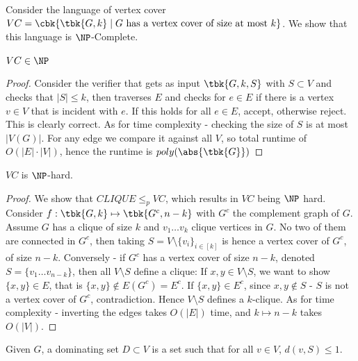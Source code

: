 \begin{example}
	Consider the language of vertex cover $VC = \cbk{\tbk{G,k}\mid G\text{ has a vertex cover of size at most }k}$. We show that this language is $\NP$-Complete.
	\begin{prop}
		$VC\in \NP$
	\end{prop}
\begin{proof}
	Consider the verifier that gets as input $\tbk{G,k,S}$ with $S\subset V$ and checks that $|S| \leq k$, then traverses $E$ and checks for $e\in E$ if there is a vertex $v\in V$ that is incident with $e$. If this holds for all $e\in E$, accept, otherwise reject. This is clearly correct. As for time complexity - checking the size of $S$ is at most $|V(G)|$. For any edge we compare it against all $V$, so total runtime of $O(|E|\cdot |V|)$, hence the runtime is $poly(\abs{\tbk{G}})$
\end{proof}
\begin{prop}
	$VC$ is $\NP$-hard.
\end{prop}
\begin{proof}
	We show that $CLIQUE \leq_p VC$, which results in $VC$ being $\NP$ hard. Consider $f:\tbk{G,k}\mapsto \tbk{G^c,n-k}$ with $G^c$ the complement graph of $G$. \\
	Assume $G$ has a clique of size $k$ and $v_1\ldots v_k$ clique vertices in $G$. No two of them are connected in $G^c$, then taking $S = V\setminus\{v_i\}_{i\in [k]}$ is hence a vertex cover of $G^c$, of size $n-k$. Conversely - if $G^c$ has a vertex cover of size $n-k$, denoted $S = \{v_1 \ldots v_{n - k}\}$, then all $V\setminus S$ define a clique: If $x,y\in V\setminus S$, we want to show $\{x,y\}\in E$, that is $\{x,y\}\notin E(G^c) = E^c$. If $\{x,y\}\in E^c$, since $x,y\notin S$ - $S$ is not a vertex cover of $G^c$, contradiction. Hence $V\setminus S$ defines a $k$-clique.
	As for time complexity - inverting the edges takes $O(|E|)$ time, and $k\mapsto n-k$ takes $O(|V|)$.
\end{proof}
\end{example}
\begin{yellowBox}
	\begin{defn}
		Given $G$, a dominating set $D\subset V$ is a set such that for all $v\in V $, $d(v,S) \leq 1$.
	\end{defn}
\end{yellowBox}
